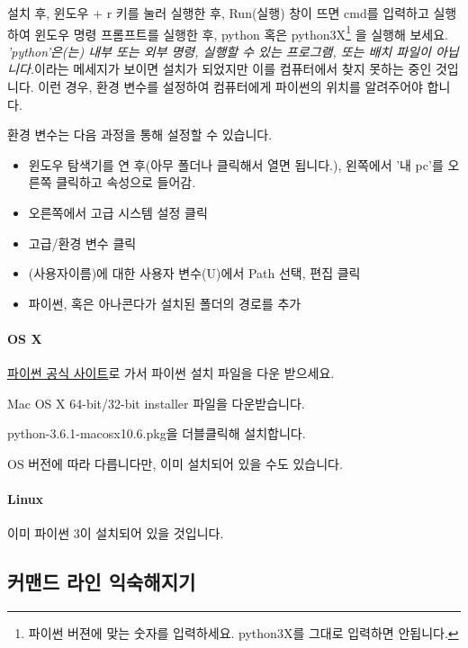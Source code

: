 \documentclass[twoside]{article}
\begin{document}
설치 후, 윈도우 + r 키를 눌러 실행한 후, Run(실행) 창이 뜨면 cmd를 입력하고 실행하여 윈도우 명령 프롬프트를 실행한 후, python 혹은 python3X\footnote{파이썬 버젼에 맞는 숫자를 입력하세요. python3X를 그대로 입력하면 안됩니다.} 을 실행해 보세요. \textit{'python'은(는) 내부 또는 외부 명령, 실행할 수 있는 프로그램, 또는 배치 파일이 아닙니다.}이라는 메세지가 보이면 설치가 되었지만 이를 컴퓨터에서 찾지 못하는 중인 것입니다. 이런 경우, 환경 변수를 설정하여 컴퓨터에게 파이썬의 위치를 알려주어야 합니다. 

환경 변수는 다음 과정을 통해 설정할 수 있습니다. 
\begin{itemize} 
\item 윈도우 탐색기를 연 후(아무 폴더나 클릭해서 열면 됩니다.), 왼쪽에서 '내 pc'를 오른쪽 클릭하고 속성으로 들어감. 
\item  오른쪽에서 고급 시스템 설정 클릭 
\item 고급/환경 변수 클릭 
\item (사용자이름)에 대한 사용자 변수(U)에서 Path 선택, 편집 클릭 
\item 파이썬, 혹은 아나콘다가 설치된 폴더의 경로를 추가
\end{itemize}

\paragraph{OS X} 

\href{https://www.python.org/downloads/}{파이썬 공식 사이트}로 가서 파이썬 설치 파일을 다운 받으세요. 

\begin{compactitem}
\item Mac OS X 64-bit/32-bit installer 파일을 다운받습니다.
\item python-3.6.1-macosx10.6.pkg을 더블클릭해 설치합니다.
\end{compactitem}

OS 버전에 따라 다릅니다만, 이미 설치되어 있을 수도 있습니다. 

\paragraph{Linux} 

이미 파이썬 3이 설치되어 있을 것입니다. 

\subsection{커맨드 라인 익숙해지기} 
\end{document}
